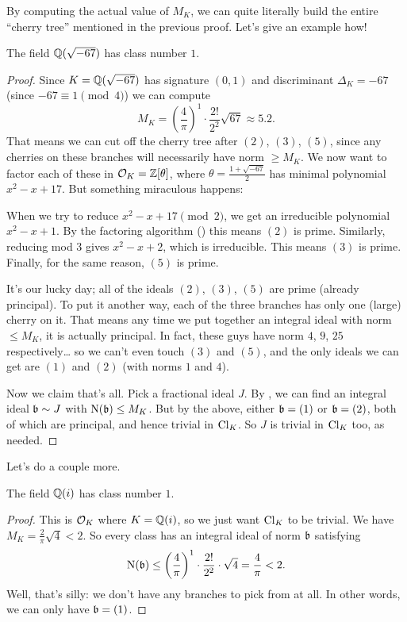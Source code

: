 By computing the actual value of $M_K$,
we can quite literally build the entire ``cherry tree'' mentioned in the previous proof.
Let's give an example how!
\begin{proposition}
	The field $\mathbb Q(\sqrt{-67})$ has class number $1$.
\end{proposition}
\begin{proof}
	Since $K = \mathbb Q(\sqrt{-67})$ has signature $(0,1)$
	and discriminant $\Delta_K = -67$ (since $-67 \equiv 1 \pmod 4$)
	we can compute
	\[ M_K = \left( \frac 4\pi \right)^{1} \cdot \frac{2!}{2^2} \sqrt{67} \approx 5.2. \]
	That means we can cut off the cherry tree after $(2)$, $(3)$, $(5)$, since any
	cherries on these branches will necessarily have norm $\ge M_K$.
	We now want to factor each of these in $\mathcal O_K = \mathbb Z[\theta]$, where $\theta = \frac{1+\sqrt{-67}}{2}$
	has minimal polynomial $x^2 - x + 17$.
	But something miraculous happens:
	\begin{itemize}
		\ii When we try to reduce $x^2-x+17 \pmod 2$, we get an irreducible polynomial $x^2-x+1$.
		By the factoring algorithm () this means $(2)$ is prime.
		\ii Similarly, reducing mod $3$ gives $x^2-x+2$, which is irreducible.
		This means $(3)$ is prime.
		\ii Finally, for the same reason, $(5)$ is prime.
	\end{itemize}
	It's our lucky day;
	all of the ideals $(2)$, $(3)$, $(5)$ are prime (already principal).
	To put it another way,
	each of the three branches has only one (large) cherry on it.
	That means any time we put together an integral ideal with norm $\le M_K$,
	it is actually principal.
	In fact, these guys have norm $4$, $9$, $25$ respectively\dots
	so we can't even touch $(3)$ and $(5)$,
	and the only ideals we can get are $(1)$ and $(2)$ (with norms $1$ and $4$).

	Now we claim that's all.
	Pick a fractional ideal $J$.
	By ,
	we can find an integral ideal $\mathfrak b \sim J$ with $\operatorname{N}(\mathfrak b) \le M_K$.
	But by the above, either $\mathfrak b = (1)$ or $\mathfrak b = (2)$, both of which are principal,
	and hence trivial in $\mathrm{Cl}_K$.
	So $J$ is trivial in $\mathrm{Cl}_K$ too, as needed.
\end{proof}
Let's do a couple more.
\begin{theorem}
	The field $\mathbb Q(i)$ has class number $1$.
\end{theorem}
\begin{proof}
	This is $\mathcal O_K$ where $K = \mathbb Q(i)$, so we just want $\mathrm{Cl}_K$ to be trivial.
	We have $M_K = \frac{2}{\pi}\sqrt{4} < 2$.
	So every class
	has an integral ideal of norm $\mathfrak b$ satisfying
	\[ 
		\operatorname{N}(\mathfrak b)
		\le \left( \frac4\pi \right)^{1} \cdot \frac{2!}{2^2} \cdot \sqrt{4}
		= \frac4\pi < 2. 
	\]
	Well, that's silly: we don't have any branches to pick from at all.
	In other words, we can only have $\mathfrak b = (1)$.
\end{proof}

